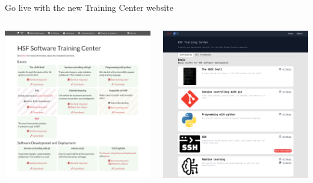 \documentclass[aspectratio=169]{beamer}
\begin{document}
\begin{frame}{Go live with the new Training Center website}
\vspace{0.25 cm}
\begin{columns}
\includegraphics[width=\linewidth]{old-website.png}

\includegraphics[width=\linewidth]{new-website.png}
\end{columns}
\end{frame}
\end{document}
